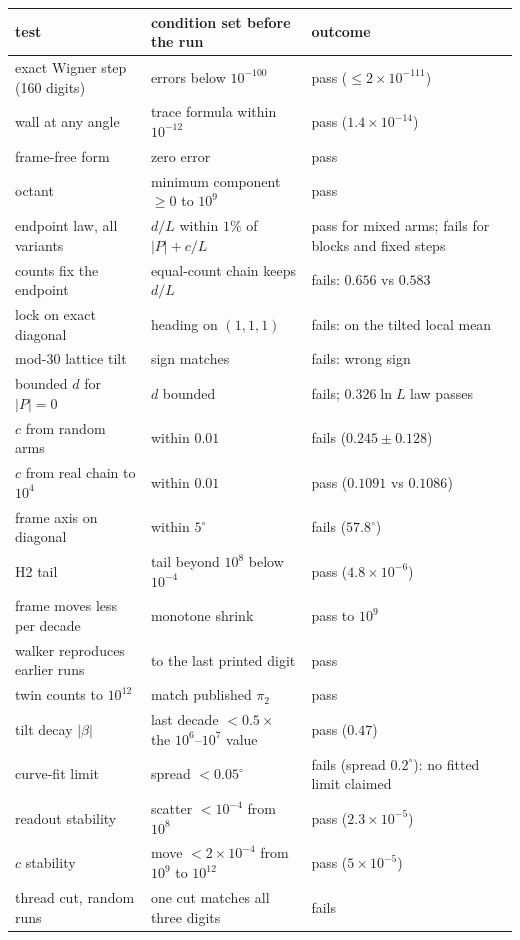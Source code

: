 \documentclass[11pt]{article}
\theoremstyle{definition}
\theoremstyle{remark}
\begin{document}
\small
\begin{longtable}{p{4.2cm}p{6.2cm}p{4.3cm}}
\toprule
test & condition set before the run & outcome\\
\midrule\endhead
exact Wigner step (160 digits) & errors below $10^{-100}$ & pass ($\le2\times10^{-111}$)\\
wall at any angle & trace formula within $10^{-12}$ & pass ($1.4\times10^{-14}$)\\
frame-free form & zero error & pass\\
octant & minimum component $\ge0$ to $10^9$ & pass\\
endpoint law, all variants & $d/L$ within $1\%$ of $|P|+c/L$ & pass for mixed arms; fails for blocks and fixed steps\\
counts fix the endpoint & equal-count chain keeps $d/L$ & fails: $0.656$ vs $0.583$\\
lock on exact diagonal & heading on $(1,1,1)$ & fails: on the tilted local mean\\
mod-30 lattice tilt & sign matches & fails: wrong sign\\
bounded $d$ for $|P|=0$ & $d$ bounded & fails; $0.326\ln L$ law passes\\
$c$ from random arms & within $0.01$ & fails ($0.245\pm0.128$)\\
$c$ from real chain to $10^4$ & within $0.01$ & pass ($0.1091$ vs $0.1086$)\\
frame axis on diagonal & within $5^\circ$ & fails ($57.8^\circ$)\\
H2 tail & tail beyond $10^8$ below $10^{-4}$ & pass ($4.8\times10^{-6}$)\\
frame moves less per decade & monotone shrink & pass to $10^9$\\
walker reproduces earlier runs & to the last printed digit & pass\\
twin counts to $10^{12}$ & match published $\pi_2$ & pass\\
tilt decay $|\beta|$ & last decade $<0.5\times$ the $10^6$--$10^7$ value & pass ($0.47$)\\
curve-fit limit & spread $<0.05^\circ$ & fails (spread $0.2^\circ$): no fitted limit claimed\\
readout stability & scatter $<10^{-4}$ from $10^8$ & pass ($2.3\times10^{-5}$)\\
$c$ stability & move $<2\times10^{-4}$ from $10^9$ to $10^{12}$ & pass ($5\times10^{-5}$)\\
thread cut, random runs & one cut matches all three digits & fails\\

\end{longtable}
\end{document}
